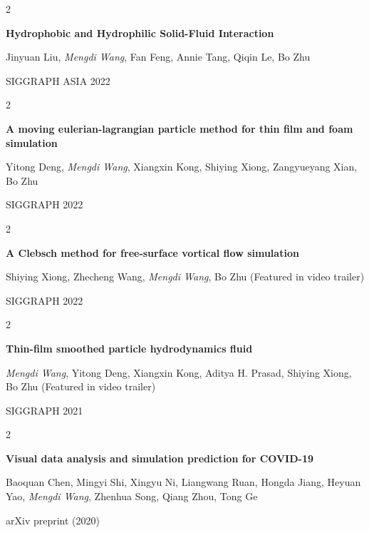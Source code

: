 \documentclass[10pt, letterpaper]{article}
\newenvironment{twocolentry}[2][]{
    \onecolentry
    \def\secondColumn{#2}
    \setcolumnwidth{\fill, 4.5 cm}
    \begin{paracol}{2}
}{
    \switchcolumn \raggedleft \secondColumn
    \end{paracol}
    \endonecolentry
} %
\begin{document}
\begin{samepage}
        \begin{twocolentry}{
            SIGGRAPH ASIA 2022
        }
            \textbf{Hydrophobic and Hydrophilic Solid-Fluid Interaction}

            \vspace{0.10 cm}

            Jinyuan Liu, \textit{Mengdi Wang}, Fan Feng, Annie Tang, Qiqin Le, Bo Zhu
        \end{twocolentry}

        \vspace{0.10 cm}

        \begin{twocolentry}{
            SIGGRAPH 2022
        }
            \textbf{A moving eulerian-lagrangian particle method for thin film and foam simulation}

            \vspace{0.10 cm}

            Yitong Deng, \textit{Mengdi Wang}, Xiangxin Kong, Shiying Xiong, Zangyueyang Xian, Bo Zhu
        \end{twocolentry}

        \vspace{0.10 cm}

        \begin{twocolentry}{
            SIGGRAPH 2022
        }
            \textbf{A Clebsch method for free-surface vortical flow simulation}

            \vspace{0.10 cm}

            Shiying Xiong, Zhecheng Wang, \textit{Mengdi Wang}, Bo Zhu (Featured in video trailer)
        \end{twocolentry}

        \vspace{0.10 cm}

        \begin{twocolentry}{
            SIGGRAPH 2021
        }
            \textbf{Thin-film smoothed particle hydrodynamics fluid}

            \vspace{0.10 cm}

            \textit{Mengdi Wang}, Yitong Deng, Xiangxin Kong, Aditya H. Prasad, Shiying Xiong, Bo Zhu (Featured in video trailer)
        \end{twocolentry}

        \vspace{0.10 cm}

        \begin{twocolentry}{
            arXiv preprint (2020)
        }
            \textbf{Visual data analysis and simulation prediction for COVID-19}

            \vspace{0.10 cm}

            Baoquan Chen, Mingyi Shi, Xingyu Ni, Liangwang Ruan, Hongda Jiang, Heyuan Yao, \textit{Mengdi Wang}, Zhenhua Song, Qiang Zhou, Tong Ge
        \end{twocolentry}
    \end{samepage}
\end{document}
